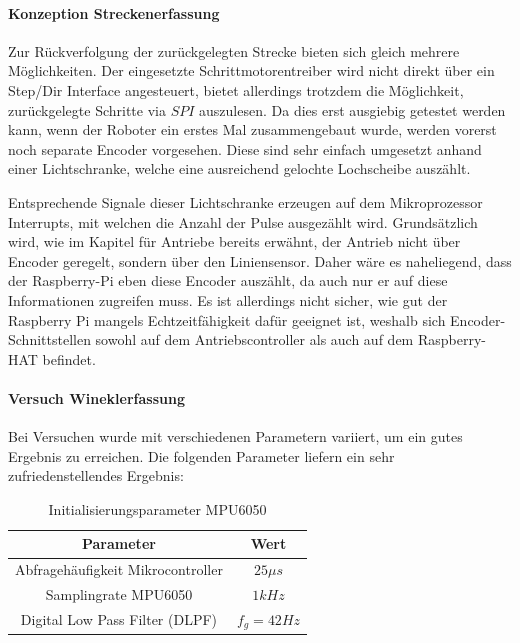\documentclass[main.tex]{subfiles} %
\begin{document}
\paragraph{Konzeption Streckenerfassung}
Zur Rückverfolgung der zurückgelegten Strecke bieten sich gleich mehrere
Möglichkeiten. Der eingesetzte Schrittmotorentreiber wird nicht direkt über ein
Step/Dir Interface angesteuert, bietet allerdings trotzdem die Möglichkeit,
zurückgelegte Schritte via $SPI$ auszulesen. Da dies erst ausgiebig getestet
werden kann, wenn der Roboter ein erstes Mal zusammengebaut wurde, werden
vorerst noch separate Encoder vorgesehen. Diese sind sehr einfach umgesetzt
anhand einer Lichtschranke, welche eine ausreichend gelochte Lochscheibe
auszählt.

Entsprechende Signale dieser Lichtschranke erzeugen auf dem Mikroprozessor
Interrupts, mit welchen die Anzahl der Pulse ausgezählt wird. Grundsätzlich
wird, wie im Kapitel für Antriebe bereits erwähnt, der Antrieb nicht über
Encoder geregelt, sondern über den Liniensensor. Daher wäre es naheliegend,
dass der Raspberry-Pi eben diese Encoder auszählt, da auch nur er auf diese
Informationen zugreifen muss. Es ist allerdings nicht sicher, wie gut der
Raspberry Pi mangels Echtzeitfähigkeit dafür geeignet ist, weshalb sich
Encoder-Schnittstellen sowohl auf dem Antriebscontroller als auch auf dem
Raspberry-HAT befindet.

\paragraph{Versuch Wineklerfassung}
Bei Versuchen wurde mit verschiedenen Parametern variiert, um ein gutes
Ergebnis zu erreichen. Die folgenden Parameter liefern ein sehr
zufriedenstellendes Ergebnis:

\begin{table}[h]                                    %
    \centering
    \begin{tabular}{|c|c|}                        %
        \hline
        Parameter                         & Wert         \\ \hline
        Abfragehäufigkeit Mikrocontroller & $25 \mu s$   \\ \hline
        Samplingrate MPU6050              & $1 kHz$      \\ \hline
        Digital Low Pass Filter (DLPF)    & $f_g = 42Hz$ \\ \hline
    \end{tabular}
    \caption{Initialisierungsparameter MPU6050}
    \label{tab:params_mpu6050}
\end{table}
\end{document}
